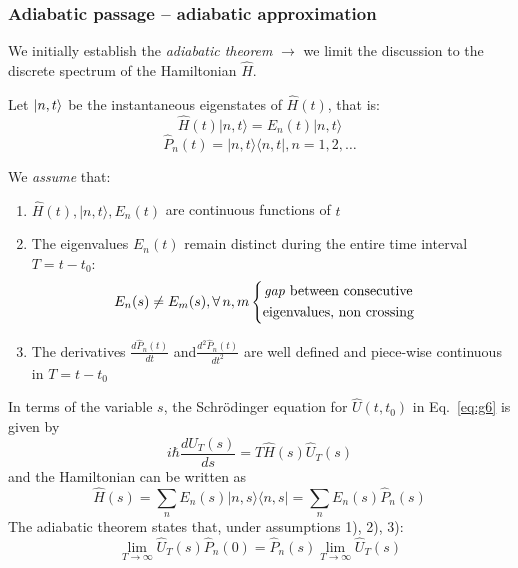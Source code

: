 \documentclass[12pt]{article}
\newcommand{\be}{\begin{equation}}
\newcommand{\ee}{\end{equation}}
\begin{document}
\subsubsection{Adiabatic passage -- adiabatic approximation}

We initially establish the \emph{adiabatic theorem}
$\rightarrow$ we limit the discussion to the discrete
spectrum of the Hamiltonian $\hat{H}$.

Let $\ket{n,t}$ be the instantaneous eigenstates of
$\hat{H}(t)$, that is:
\be
\hat{H}(t)|n, t\rangle=E_{n}(t)|n, t\rangle
\ee
%
\be
\hat{P}_{n}(t)=|n, t\rangle\langle n, t|, n=1,2, \ldots
\ee


We \emph{assume} that:
\begin{enumerate}
\item $\hat{H}(t),|n, t\rangle, E_{n}(t)$ are continuous functions of $t$
%
\item The eigenvalues $E_{n}(t)$ remain distinct
during the entire time interval $T=t-t_{0}$:
\[
E_{n}(s) \neq E_{m}(s), \forall\, n, m
\begin{cases}
\begin{gathered}
\text{\emph{gap} between consecutive}\\
\text{eigenvalues, non crossing}
\end{gathered}
\end{cases}
\]
%
\item The derivatives $\frac{d\hat{P}_n(t)}{dt}$ and$ \frac{d^2\hat{P}_n(t)}{dt^2}$ are well
defined and piece-wise continuous in $T=t-t_0$
\end{enumerate}
%
In terms of the variable $s$, the Schrödinger equation
for $\hat{U}\left(t, t_{0}\right)$ in Eq.~\eqref{eq:g6} is given by
\be
i \hbar \frac{d U_{T}(s)}{d s}=T \hat{H}(s) \hat{U}_{T}(s)
\label{eq:g20}
\ee
and the Hamiltonian can be written as
\be
\hat{H}(s)=\sum_{n} E_{n}(s)|n, s\rangle\langle n, s|=\sum_{n} E_{n}(s) \hat{P}_{n}(s)
\ee
The adiabatic theorem states that, under assumptions 1), 2), 3):
\be
\boxed{
\lim_{T \rightarrow \infty} \hat{U}_{T}(s) \hat{P}_{n}(0)=
\hat{P}_{n}(s) \lim_{T \rightarrow \infty} \hat{U}_{T}(s)
}
\ee

\end{document}
